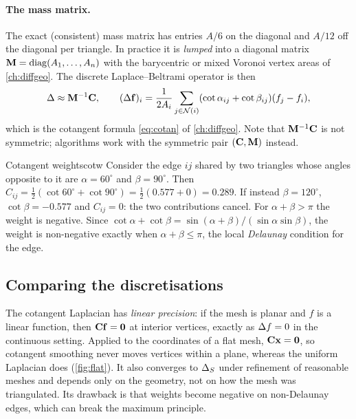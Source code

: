 \paragraph{The mass matrix.} The exact (consistent) mass matrix has entries $A/6$ on the diagonal
and $A/12$ off the diagonal per triangle. In practice it is \emph{lumped} into a diagonal matrix
$\mathbf{M}=\operatorname{diag}(A_1,\dots,A_n)$ with the barycentric or mixed Voronoi vertex areas of \cref{ch:diffgeo}.
The discrete Laplace--Beltrami operator is then
\begin{equation}
\Delta\approx\mathbf{M}^{-1}\mathbf{C},\qquad (\Delta\mathbf{f})_i=\frac{1}{2A_i}\sum_{j\in\mathcal N(i)}(\cot\alpha_{ij}+\cot\beta_{ij})(f_j-f_i),
\end{equation}
which is the cotangent formula \eqref{eq:cotan} of \cref{ch:diffgeo}. Note that
$\mathbf{M}^{-1}\mathbf{C}$ is not symmetric; algorithms work with the symmetric pair $(\mathbf{C},\mathbf{M})$ instead.

\begin{example}{Cotangent weights}{cotw}
Consider the edge $ij$ shared by two triangles whose angles opposite to it are $\alpha=60^\circ$
and $\beta=90^\circ$. Then $C_{ij}=\tfrac12(\cot60^\circ+\cot90^\circ)=\tfrac12(0.577+0)=0.289$.
If instead $\beta=120^\circ$, $\cot\beta=-0.577$ and $C_{ij}=0$: the two contributions cancel.
For $\alpha+\beta>\pi$ the weight is negative. Since
$\cot\alpha+\cot\beta=\sin(\alpha+\beta)/(\sin\alpha\sin\beta)$, the weight is non-negative exactly
when $\alpha+\beta\le\pi$, the local \emph{Delaunay} condition for the edge.
\end{example}

\subsection{Comparing the discretisations}

The cotangent Laplacian has \emph{linear precision}: if the mesh is planar and $f$ is a linear
function, then $\mathbf{C}\mathbf{f}=\mathbf{0}$ at interior vertices, exactly as $\Delta f=0$ in the continuous
setting. Applied to the coordinates of a flat mesh, $\mathbf{C}\mathbf{x}=\mathbf{0}$, so cotangent smoothing never
moves vertices within a plane, whereas the uniform Laplacian does (\cref{fig:flat}). It also
converges to $\Delta_S$ under refinement of reasonable meshes and depends only on the geometry, not
on how the mesh was triangulated. Its drawback is that weights become negative on non-Delaunay
edges, which can break the maximum principle.


